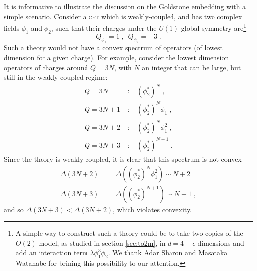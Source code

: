 \documentclass[11pt]{article}
\numberwithin{equation}{section}
\newcommand{\be}{\begin{equation}} \newcommand{\ee}{\end{equation}}
\newcommand{\bea}{\begin{eqnarray}}  \newcommand{\eea}{\end{eqnarray}}
\begin{document}
It is informative to illustrate the discussion on the Goldstone embedding with a simple scenario. Consider a \textsc{cft} which is weakly-coupled, and has two complex fields $\phi_1$ and $\phi_2$, such that their charges under the $U(1)$ global symmetry are\footnote{A simple way to construct such a theory could be to take two copies of the $O(2)$ model, as studied in section \ref{sec:to2m}, in $d=4-\epsilon$ dimensions and add an interaction term $\lambda \phi_1^3 \phi_2$. We thank Adar Sharon and Masataka Watanabe for brining this possibility to our attention.}
\be
Q_{\phi_1} = 1 \;,\;\; Q_{\phi_2} = -3 \;.
\ee
Such a theory would not have a convex spectrum of operators (of lowest dimension for a given charge). For example, consider the lowest dimension operators of charges around $Q=3N$, with $N$ an integer that can be large, but still in the weakly-coupled regime:
\bea
Q=3N \;&:&\; \left(\phi_2^*\right)^N \;, \\
Q=3N+1 \;&:&\; \left(\phi_2^*\right)^N \phi_1 \;, \\
Q=3N+2 \;&:&\; \left(\phi_2^*\right)^N \phi_1^2 \;, \\
Q=3N+3 \;&:&\; \left(\phi_2^*\right)^{N+1} \;.
\eea
Since the theory is weakly coupled, it is clear that this spectrum is not convex
\bea
\Delta\left(3N+2\right) &=& \Delta\left(\left(\phi_2^*\right)^N \phi_1^2\right) \sim N+2 \\
\Delta\left(3N+3\right) &=& \Delta\left(\left(\phi_2^*\right)^{N+1}\right) \sim N+1 \;,
\eea
and so $\Delta\left(3N+3\right) < \Delta\left(3N+2\right)$, which violates convexity.
\end{document}
